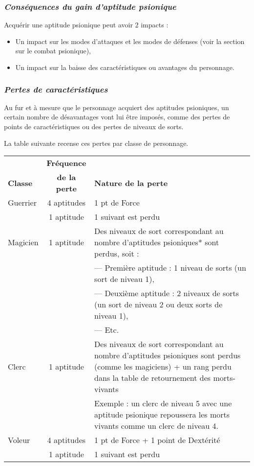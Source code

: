 \newpage
\subsubsection*{\textit{Conséquences du gain d'aptitude psionique}}

Acquérir une aptitude psionique peut avoir 2 impacts :
\begin{itemize}
\item Un impact sur les modes d'attaques et les modes de défenses (voir la section sur le combat psionique),
\item Un impact sur la baisse des caractéristiques ou avantages du personnage.
\end{itemize}

\subsubsection*{\textit{Pertes de caractéristiques}}

Au fur et à mesure que le personnage acquiert des aptitudes psioniques, un certain nombre de désavantages vont lui être imposés, comme des pertes de points de caractéristiques ou des pertes de niveaux de sorts.

\bigskip

La table suivante recense ces pertes par classe de personnage.

\bigskip

\begin{tabular}{lcp{12cm}}
& \textbf{Fréquence} & \\
\textbf{Classe} & \textbf{de la perte} & \textbf{Nature de la perte}\\
Guerrier & 4 aptitudes & 1 pt de Force \\
& 1 aptitude & 1 suivant est perdu \\
Magicien & 1 aptitude & Des niveaux de sort correspondant au nombre d'aptitudes psioniques* sont perdus, soit : \\
&& --- Première aptitude : 1 niveau de sorts (un sort de niveau 1), \\
&& --- Deuxième aptitude : 2 niveaux de sorts (un sort de niveau 2 ou deux sorts de niveau 1), \\
&& --- Etc. \\
Clerc & 1 aptitude & Des niveaux de sort correspondant au nombre d'aptitudes psioniques sont perdus (comme les magiciens) + un rang perdu dans la table de retournement des morts-vivants \\
&& Exemple : un clerc de niveau 5 avec une aptitude psionique repoussera les morts vivants comme un clerc de niveau 4. \\
Voleur & 4 aptitudes & 1 pt de Force + 1 point de Dextérité \\
& 1 aptitude & 1 suivant est perdu \\
\end{tabular}

